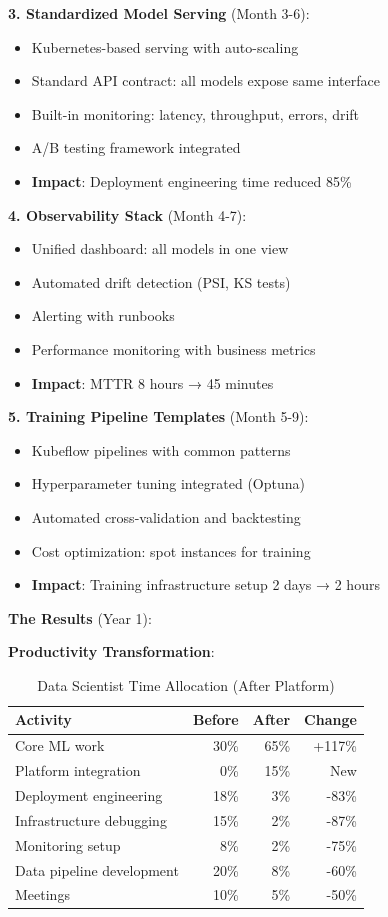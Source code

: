 \textbf{3. Standardized Model Serving} (Month 3-6):
\begin{itemize}
    \item Kubernetes-based serving with auto-scaling
    \item Standard API contract: all models expose same interface
    \item Built-in monitoring: latency, throughput, errors, drift
    \item A/B testing framework integrated
    \item \textbf{Impact}: Deployment engineering time reduced 85\%
\end{itemize}

\textbf{4. Observability Stack} (Month 4-7):
\begin{itemize}
    \item Unified dashboard: all models in one view
    \item Automated drift detection (PSI, KS tests)
    \item Alerting with runbooks
    \item Performance monitoring with business metrics
    \item \textbf{Impact}: MTTR 8 hours → 45 minutes
\end{itemize}

\textbf{5. Training Pipeline Templates} (Month 5-9):
\begin{itemize}
    \item Kubeflow pipelines with common patterns
    \item Hyperparameter tuning integrated (Optuna)
    \item Automated cross-validation and backtesting
    \item Cost optimization: spot instances for training
    \item \textbf{Impact}: Training infrastructure setup 2 days → 2 hours
\end{itemize}

\textbf{The Results} (Year 1):

\textbf{Productivity Transformation}:

\begin{table}[h]
\centering
\caption{Data Scientist Time Allocation (After Platform)}
\begin{tabular}{lrrr}
\toprule
\textbf{Activity} & \textbf{Before} & \textbf{After} & \textbf{Change} \\
\midrule
Core ML work & 30\% & 65\% & +117\% \\
Platform integration & 0\% & 15\% & New \\
Deployment engineering & 18\% & 3\% & -83\% \\
Infrastructure debugging & 15\% & 2\% & -87\% \\
Monitoring setup & 8\% & 2\% & -75\% \\
Data pipeline development & 20\% & 8\% & -60\% \\
Meetings & 10\% & 5\% & -50\% \\
\bottomrule
\end{tabular}
\end{table}

